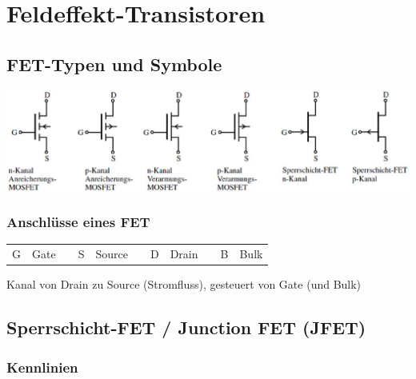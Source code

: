 \section{Feldeffekt-Transistoren}

\subsection{FET-Typen und Symbole}

    \includegraphics[align=t, width=\columnwidth]{images/fet_symbole_typen.png}

\subsubsection{Anschlüsse eines FET}

    \begin{tabular}{l l  c l l c l l c l l}
        G & Gate & & S & Source & & D & Drain & & B & Bulk \\
    \end{tabular}

    Kanal von Drain zu Source (Stromfluss), gesteuert von Gate (und Bulk)


\subsection{Sperrschicht-FET / Junction FET (JFET)}


   

\subsubsection{Kennlinien}

